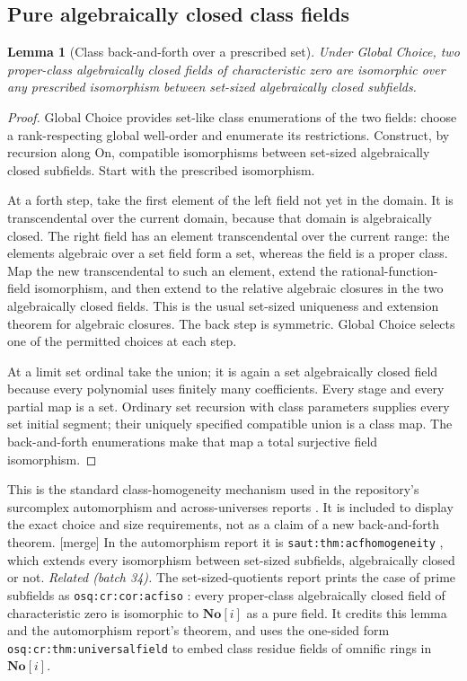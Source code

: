 \documentclass[11pt,letterpaper]{article}
\numberwithin{equation}{section}
\newtheorem{lemma}[theorem]{Lemma}
\theoremstyle{definition}
\theoremstyle{remark}
\newcommand{\mergetag}{\textup{\textsf{\small[merge]}}}%
\newcommand{\SC}{\mathbf{No}[i]}
\newcommand{\On}{\mathrm{On}}
\newcommand{\lbl}[1]{\nolinkurl{#1}}%
\begin{document}
\subsection{Pure algebraically closed class fields}
\begin{lemma}[Class back-and-forth over a prescribed set]\label{fkc:sb:lem:backforth}
Under Global Choice, two proper-class algebraically closed fields of characteristic zero are isomorphic over any prescribed isomorphism between set-sized algebraically closed subfields.
\end{lemma}
\begin{proof}
Global Choice provides set-like class enumerations of the two fields: choose a rank-respecting global well-order and enumerate its restrictions. Construct, by recursion along $\On$, compatible isomorphisms between set-sized algebraically closed subfields. Start with the prescribed isomorphism.

At a forth step, take the first element of the left field not yet in the domain. It is transcendental over the current domain, because that domain is algebraically closed. The right field has an element transcendental over the current range: the elements algebraic over a set field form a set, whereas the field is a proper class. Map the new transcendental to such an element, extend the rational-function-field isomorphism, and then extend to the relative algebraic closures in the two algebraically closed fields. This is the usual set-sized uniqueness and extension theorem for algebraic closures. The back step is symmetric. Global Choice selects one of the permitted choices at each step.

At a limit set ordinal take the union; it is again a set algebraically closed field because every polynomial uses finitely many coefficients. Every stage and every partial map is a set. Ordinary set recursion with class parameters supplies every set initial segment; their uniquely specified compatible union is a class map. The back-and-forth enumerations make that map a total surjective field isomorphism.
\end{proof}

This is the standard class-homogeneity mechanism used in the repository's surcomplex automorphism and across-universes reports \cite{CollUniv}. It is included to display the exact choice and size requirements, not as a claim of a new back-and-forth theorem. \mergetag{} In the automorphism report it is \lbl{saut:thm:acfhomogeneity} \cite{CollSAUT}, which extends every isomorphism between set-sized subfields, algebraically closed or not. \emph{Related (batch 34).} The set-sized-quotients report prints the case of prime subfields as \lbl{osq:cr:cor:acfiso} \cite{CollOSQ}: every proper-class algebraically closed field of characteristic zero is isomorphic to $\SC$ as a pure field. It credits this lemma and the automorphism report's theorem, and uses the one-sided form \lbl{osq:cr:thm:universalfield} to embed class residue fields of omnific rings in $\SC$.
\end{document}
